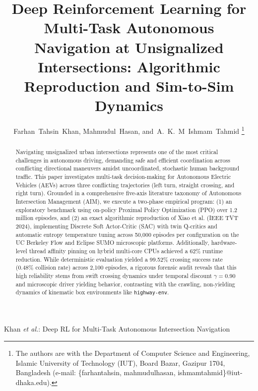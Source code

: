 \documentclass[journal]{IEEEtran}
\begin{document}
\title{Deep Reinforcement Learning for Multi-Task Autonomous Navigation at Unsignalized Intersections: Algorithmic Reproduction and Sim-to-Sim Dynamics}

\author{Farhan~Tahsin~Khan,
        Mahmudul~Hasan,
        and~A.~K.~M~Ishmam~Tahmid%
\thanks{The authors are with the Department of Computer Science and Engineering, Islamic University of Technology (IUT), Board Bazar, Gazipur 1704, Bangladesh (e-mail: \{farhantahsin, mahmudulhasan, ishmamtahmid\}@iut-dhaka.edu).}%
}

%
{Khan \MakeLowercase{\textit{et al.}}: Deep RL for Multi-Task Autonomous Intersection Navigation}

\maketitle

\begin{abstract}
Navigating unsignalized urban intersections represents one of the most critical challenges in autonomous driving, demanding safe and efficient coordination across conflicting directional maneuvers amidst uncoordinated, stochastic human background traffic. This paper investigates multi-task decision-making for Autonomous Electric Vehicles (AEVs) across three conflicting trajectories (left turn, straight crossing, and right turn). Grounded in a comprehensive five-axis literature taxonomy of Autonomous Intersection Management (AIM), we execute a two-phase empirical program: (1) an exploratory benchmark using on-policy Proximal Policy Optimization (PPO) over 1.2 million episodes, and (2) an exact algorithmic reproduction of Xiao et al. (IEEE TVT 2024), implementing Discrete Soft Actor-Critic (SAC) with twin Q-critics and automatic entropy temperature tuning across 50,000 episodes per configuration on the UC Berkeley Flow and Eclipse SUMO microscopic platforms. Additionally, hardware-level thread affinity pinning on hybrid multi-core CPUs achieved a 62\% runtime reduction. While deterministic evaluation yielded a 99.52\% crossing success rate (0.48\% collision rate) across 2,100 episodes, a rigorous forensic audit reveals that this high reliability stems from swift crossing dynamics under temporal discount $\gamma=0.90$ and microscopic driver yielding behavior, contrasting with the crawling, non-yielding dynamics of kinematic box environments like \texttt{highway-env}.
\end{abstract}
\end{document}
